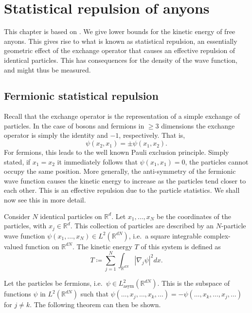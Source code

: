 
\chapter{Statistical repulsion of anyons}\label{chap:statistical repulsion}

This chapter is based on \cite{methmmp,lundholm-solovej,mancarella}. We give lower bounds for the kinetic energy of free anyons. This gives rise to what is known as statistical repulsion, an essentially geometric effect of the exchange operator that causes an effective repulsion of identical particles. This has consequences for the density of the wave function, and might thus be measured.


\section{Fermionic statistical repulsion}

Recall that the exchange operator is the representation of a simple exchange of particles. In the case of bosons and fermions in $\ge 3$ dimensions the exchange operator is simply the identity and $-1$, respectively. That is,
\begin{equation}
  \psi(x_2, x_1) = \pm \psi(x_1, x_2).
\end{equation}
For fermions, this leads to the well known Pauli exclusion principle. Simply stated, if $x_1 = x_2$ it immediately follows that $\psi(x_1, x_1) = 0$, the particles cannot occupy the same position. More generally, the anti-symmetry of the fermionic wave function causes the kinetic energy to increase as the particles tend closer to each other. This is an effective repulsion due to the particle statistics. We shall now see this in more detail.

Consider $N$ identical particles on $\mathbb{R}^d$. Let $x_1, \ldots, x_N$ be the coordinates of the particles, with $x_j \in \mathbb{R}^d$. This collection of particles are described by an $N$-particle wave function $\psi(x_1, \ldots, x_N) \in L^2(\mathbb{R}^{dN})$, i.e.\ a square integrable complex-valued function on $\mathbb{R}^{dN}$. The kinetic energy $T$ of this system is defined as
\begin{equation}
  T \coloneqq \sum_{j=1}^N \int_{\mathbb{R}^{dN}} |\nabla_j \psi|^2 dx.
\end{equation}

Let the particles be fermions, i.e.\ $\psi \in L_\text{asym}^2(\mathbb{R}^{dN})$. This is the subspace of functions $\psi$ in $L^2(\mathbb{R}^{dN})$ such that $\psi(\ldots, x_j, \ldots, x_k, \ldots) = - \psi(\ldots, x_k, \ldots, x_j, \ldots)$ for $j \ne k$. The following theorem can then be shown. \cite{methmmp}

